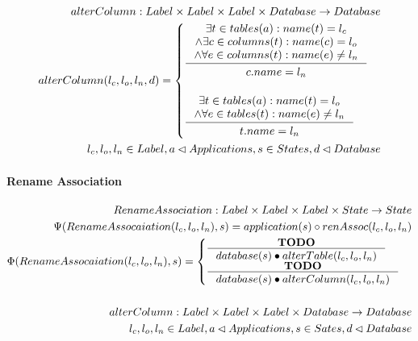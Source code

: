 \documentclass[11pt]{article}
\begin{document}
\begin{align*}
alterColumn : Label \times Label \times Label \times Database \rightarrow Database \\
	alterColumn(l_c, l_o, l_n, d) = \begin{cases}
 \inference{\exists t \in tables(a) : name(t) = l_c \\ \wedge \exists c \in columns(t) : name(c) = l_o \\ \wedge \forall e \in columns(t) : name(e) \neq l_n}{\begin{gathered}
c.name = l_n 
\end{gathered}}
\\ \\
\inference{\exists t \in tables(a) : name(t) = l_o \\ \wedge \forall e \in tables(t) : name(e) \neq l_n}{\begin{gathered}
t.name = l_n 
\end{gathered}}
 \end{cases}
 \\
l_c, l_o, l_n \in Label, a \lhd Applications, s \in States, d \lhd Database
\end{align*}

\paragraph{Rename Association}
\begin{align*}
RenameAssociation : Label \times Label \times Label \times State \rightarrow State \\
\Psi(RenameAssocaiation(l_c, l_o, l_n), s) = application(s) \circ renAssoc(l_c, l_o, l_n)\\
\Phi(RenameAssocaiation(l_c, l_o, l_n), s) = \begin{cases}
	\inference{\mathbf{TODO}}{database(s) \bullet alterTable(l_c, l_o, l_n)}
 \\
  \inference{\mathbf{TODO}}{database(s) \bullet alterColumn(l_c, l_o, l_n)}
 \end{cases}
\\\\
alterColumn : Label \times Label \times Label \times Database \rightarrow Database \\
l_c, l_o, l_n \in Label, a \lhd Applications, s \in Sates, d \lhd Database
\end{align*}
\end{document}
